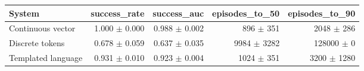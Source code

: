 \begin{tabular}{lrrrr}\toprule System & success\_rate & success\_auc & episodes\_to\_50 & episodes\_to\_90 \\\midrule
Continuous vector & 1.000 $\pm$ 0.000 & 0.988 $\pm$ 0.002 & 896 $\pm$ 351 & 2048 $\pm$ 286 \\
Discrete tokens & 0.678 $\pm$ 0.059 & 0.637 $\pm$ 0.035 & 9984 $\pm$ 3282 & 128000 $\pm$ 0 \\
Templated language & 0.931 $\pm$ 0.010 & 0.923 $\pm$ 0.004 & 1024 $\pm$ 351 & 3200 $\pm$ 1280 \\
\bottomrule\end{tabular}
